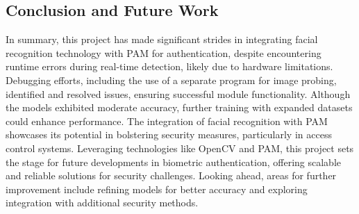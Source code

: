 \documentclass[
]{article}
\begin{document}
\begin{multicols}{2}

\section{Conclusion and Future Work}
In summary, this project has made significant strides in integrating facial recognition technology with PAM for authentication, despite encountering runtime errors during real-time detection, likely due to hardware limitations. Debugging efforts, including the use of a separate program for image probing, identified and resolved issues, ensuring successful module functionality. Although the models exhibited moderate accuracy, further training with expanded datasets could enhance performance. The integration of facial recognition with PAM showcases its potential in bolstering security measures, particularly in access control systems. Leveraging technologies like OpenCV and PAM, this project sets the stage for future developments in biometric authentication, offering scalable and reliable solutions for security challenges. Looking ahead, areas for further improvement include refining models for better accuracy and exploring integration with additional security methods.

\end{multicols}



\end{document}
